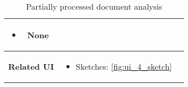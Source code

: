 \begin{table}[H]
\begin{tabularx}{0.75\linewidth}{||Sc|X||}
\begin{minipage}[l]{\linewidth}
\begin{itemize}[wide, labelindent=0pt]
                \item \textbf{None}
            \end{itemize}
        \end{minipage} \\
        \hline
        \textbf{Related UI} & 
        \begin{minipage}[l]{\linewidth}
            \begin{itemize}[wide, labelindent=0pt]
                \vspace{4pt}
                \item Sketches: \ref{fig:ui_4_sketch}
                \vspace{4pt}
            \end{itemize}
        \end{minipage}\\
        \hline
        \hline
    \end{tabularx}
    \caption{Partially processed document analysis}
    \label{tab:use_case_partially_processed}
\end{table}

